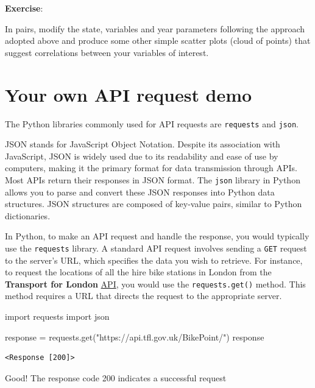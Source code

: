 \documentclass[
  letterpaper,
  DIV=11,
  numbers=noendperiod]{scrreprt}
\newenvironment{Shaded}{\begin{snugshade}}{\end{snugshade}}
\newcommand{\ImportTok}[1]{\textcolor[rgb]{0.00,0.46,0.62}{#1}}
\newcommand{\NormalTok}[1]{\textcolor[rgb]{0.00,0.23,0.31}{#1}}
\newcommand{\OperatorTok}[1]{\textcolor[rgb]{0.37,0.37,0.37}{#1}}
\newcommand{\StringTok}[1]{\textcolor[rgb]{0.13,0.47,0.30}{#1}}
\begin{document}
\textbf{Exercise}:

In pairs, modify the state, variables and year parameters following the
approach adopted above and produce some other simple scatter plots
(cloud of points) that suggest correlations between your variables of
interest.

\section{Your own API request demo}\label{your-own-api-request-demo}

The Python libraries commonly used for API requests are
\texttt{requests} and \texttt{json}.

JSON stands for JavaScript Object Notation. Despite its association with
JavaScript, JSON is widely used due to its readability and ease of use
by computers, making it the primary format for data transmission through
APIs. Most APIs return their responses in JSON format. The \texttt{json}
library in Python allows you to parse and convert these JSON responses
into Python data structures. JSON structures are composed of key-value
pairs, similar to Python dictionaries.

In Python, to make an API request and handle the response, you would
typically use the \texttt{requests} library. A standard API request
involves sending a \texttt{GET} request to the server's URL, which
specifies the data you wish to retrieve. For instance, to request the
locations of all the hire bike stations in London from the
\textbf{Transport for London} \href{https://api.tfl.gov.uk}{API}, you
would use the \texttt{requests.get()} method. This method requires a URL
that directs the request to the appropriate server.

\begin{Shaded}
\begin{Highlighting}[]
\ImportTok{import}\NormalTok{ requests}
\ImportTok{import}\NormalTok{ json}

\NormalTok{response }\OperatorTok{=}\NormalTok{ requests.get(}\StringTok{"https://api.tfl.gov.uk/BikePoint/"}\NormalTok{)}
\NormalTok{response}
\end{Highlighting}
\end{Shaded}

\begin{verbatim}
<Response [200]>
\end{verbatim}

Good! The response code 200 indicates a successful request
\end{document}
